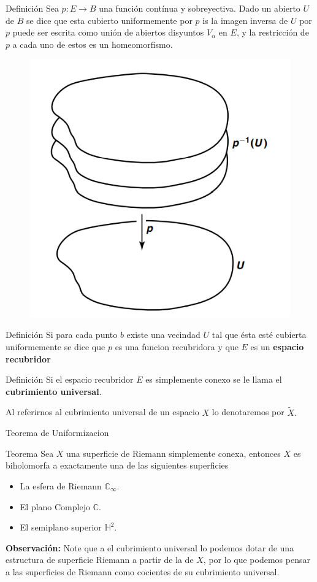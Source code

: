 \documentclass[xcolor=dvipsnames,10pt]{beamer}
\newcommand\C{\ensuremath{\mathbb{C}}}
\newcommand\Hs{\ensuremath{\mathbb{H}}}
\begin{document}
\begin{frame}
    \begin{block}{Definición}
        Sea $p:E\to B$ una función contínua y sobreyectiva. Dado un abierto $U$ de $B$ se dice que esta cubierto uniformemente por $p$ is la imagen inversa de $U$ por $p$ puede ser escrita como unión de abiertos disyuntos $V_\alpha$ en $E$, y la restricción de $p$ a cada uno de estos es un homeomorfismo.
        \end{block} 
        \begin{figure}
            \centering
            \includegraphics[width=0.4\linewidth]{Imagenes/imagen_2025-07-10_120527033.png}
        \end{figure}   
\end{frame}
\begin{frame}
        \begin{block}{Definición}
        Si para cada punto $b$ existe una vecindad $U$ tal que ésta esté cubierta uniformemente se dice que $p$ es una funcion recubridora y que $E$ es un \textbf{espacio recubridor}
        \end{block} 
        \begin{block}{Definición}
            Si el espacio recubridor $E$ es simplemente conexo se le llama el \textbf{cubrimiento universal}.
        \end{block}
        Al referirnos al cubrimiento universal de un espacio $X$ lo denotaremos por $\tilde{X}.$
        
\end{frame}
\begin{frame}{Teorema de Uniformizacion}
    \begin{block}{Teorema}
        Sea $X$ una superficie de Riemann simplemente conexa, entonces $X$ es biholomorfa a exactamente una de las siguientes superficies
        \begin{itemize}
            \item La esfera de Riemann $\C_{\infty}.$
            \item El plano Complejo $\C.$
            \item El semiplano superior $\Hs^2.$
        \end{itemize}
    \end{block}
    \textbf{Observación:} Note que a el cubrimiento universal lo podemos dotar de una estructura de superficie Riemann a partir de la de $X$, por lo que podemos pensar a las superficies de Riemann como cocientes de su cubrimiento universal.  
\end{frame}
\end{document}

